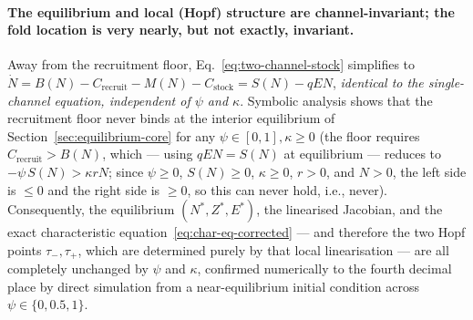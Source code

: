 \documentclass[twocolumn,10pt]{article}
\begin{document}
\paragraph{The equilibrium and local (Hopf) structure are channel-invariant; the fold location is very nearly, but not exactly, invariant.} Away from the recruitment floor, Eq.~\eqref{eq:two-channel-stock} simplifies to $\dot N = B(N)-C_{\text{recruit}}-M(N)-C_{\text{stock}} = S(N) - qEN$, \emph{identical to the single-channel equation, independent of $\psi$ and $\kappa$}. Symbolic analysis shows that the recruitment floor never binds at the interior equilibrium of Section~\ref{sec:equilibrium-core} for any $\psi\in[0,1],\kappa\ge0$ (the floor requires $C_{\text{recruit}}>B(N)$, which — using $qEN=S(N)$ at equilibrium — reduces to $-\psi\,S(N) > \kappa r N$; since $\psi\ge0$, $S(N)\ge0$, $\kappa\ge0$, $r>0$, and $N>0$, the left side is $\le0$ and the right side is $\ge0$, so this can never hold, i.e., never). Consequently, the equilibrium $(N^*,Z^*,E^*)$, the linearised Jacobian, and the exact characteristic equation~\eqref{eq:char-eq-corrected} — and therefore the two Hopf points $\tau_-,\tau_+$, which are determined purely by that local linearisation — are all completely unchanged by $\psi$ and $\kappa$, confirmed numerically to the fourth decimal place by direct simulation from a near-equilibrium initial condition across $\psi\in\{0,0.5,1\}$.
\end{document}
